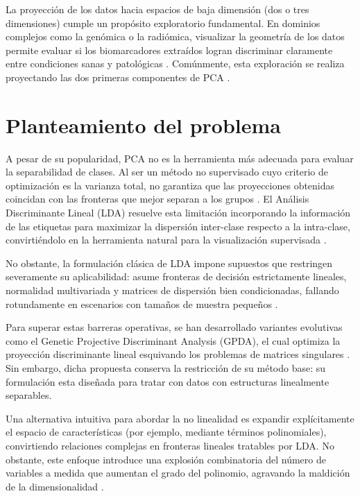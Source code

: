 La proyección de los datos hacia espacios de baja dimensión (dos o tres dimensiones) cumple un propósito exploratorio fundamental. En dominios complejos como la genómica o la radiómica, visualizar la geometría de los datos permite evaluar si los biomarcadores extraídos logran discriminar claramente entre condiciones sanas y patológicas \cite{bruno2020data, neha2026radiomics}. Comúnmente, esta exploración se realiza proyectando las dos primeras componentes de PCA \cite{kabir2023performance}.

\section{Planteamiento del problema}

A pesar de su popularidad, PCA no es la herramienta más adecuada para evaluar la separabilidad de clases. Al ser un método no supervisado cuyo criterio de optimización es la varianza total, no garantiza que las proyecciones obtenidas coincidan con las fronteras que mejor separan a los grupos \cite{rabbi2025performance}. El Análisis Discriminante Lineal (LDA) resuelve esta limitación incorporando la información de las etiquetas para maximizar la dispersión inter-clase respecto a la intra-clase, convirtiéndolo en la herramienta natural para la visualización supervisada \cite{chhikara2022data}.

No obstante, la formulación clásica de LDA impone supuestos que restringen severamente su aplicabilidad: asume fronteras de decisión estrictamente lineales, normalidad multivariada y matrices de dispersión bien condicionadas, fallando rotundamente en escenarios con tamaños de muestra pequeños \cite{feng2021comparison}. 

Para superar estas barreras operativas, se han desarrollado variantes evolutivas como el Genetic Projective Discriminant Analysis (GPDA), el cual optimiza la proyección discriminante lineal esquivando los problemas de matrices singulares \cite{medina2025genetic}. Sin embargo, dicha propuesta conserva la restricción de su método base: su formulación esta diseñada para tratar con datos con estructuras linealmente separables.

Una alternativa intuitiva para abordar la no linealidad es expandir explícitamente el espacio de características (por ejemplo, mediante términos polinomiales), convirtiendo relaciones complejas en fronteras lineales tratables por LDA. No obstante, este enfoque introduce una explosión combinatoria del número de variables a medida que aumentan el grado del polinomio, agravando la maldición de la dimensionalidad \cite{bishop2006pattern}.

